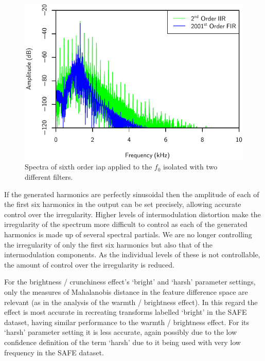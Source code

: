 			\begin{figure}[h!]
				\centering
				\includegraphics{chapter7/Images/CelloFilterOrderSpectra.pdf}
				\caption{Spectra of sixth order \acrshort{iap} applied to the $f_{0}$ isolated with two
					 different filters.}
				\label{fig:CelloFilterOrderSpectra}
			\end{figure}

			If the generated harmonics are perfectly sinusoidal then the amplitude of each of the first six
			harmonics in the output can be set precisely, allowing accurate control over the irregularity.
			Higher levels of intermodulation distortion make the irregularity of the spectrum more difficult to
			control as each of the generated harmonics is made up of several spectral partials. We are no
			longer controlling the irregularity of only the first six harmonics but also that of the
			intermodulation components. As the individual levels of these is not controllable, the amount of
			control over the irregularity is reduced.

			For the brightness / crunchiness effect's `bright' and `harsh' parameter settings, only the
			measures of Mahalanobis distance in the feature difference space are relevant (as in the analysis
			of the warmth / brightness effect). In this regard the effect is most accurate in recreating
			transforms labelled `bright' in the SAFE dataset, having similar performance to the warmth /
			brightness effect.  For its `harsh' parameter setting it is less accurate, again possibly due to
			the low confidence definition of the term `harsh' due to it being used with very low frequency in
			the SAFE dataset.


